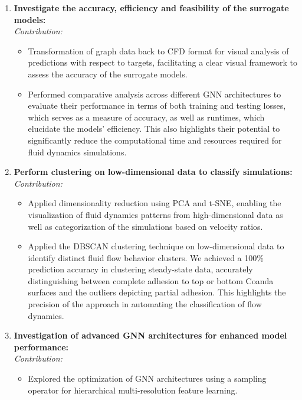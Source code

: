 \begin{enumerate}
    \item \textbf{Investigate the accuracy, efficiency and feasibility of the surrogate models:} \\
    \textit{Contribution:}
    \begin{itemize}
        \item Transformation of graph data back to CFD format for visual analysis of predictions with respect to targets, facilitating a clear visual framework to assess the accuracy of the surrogate models.
        \item Performed comparative analysis across different GNN architectures to evaluate their performance in terms of both training and testing losses, which serves as a measure of accuracy, as well as runtimes, which elucidate the models' efficiency. This also highlights their potential to significantly reduce the computational time and resources required for fluid dynamics simulations. 
    \end{itemize}
    \item \textbf{Perform clustering on low-dimensional data to classify simulations:} \\
    \textit{Contribution:}
    \begin{itemize}
        \item Applied dimensionality reduction using PCA and t-SNE, enabling the visualization of fluid dynamics patterns from high-dimensional data as well as categorization of the simulations based on velocity ratios. 
        \item Applied the DBSCAN clustering technique on low-dimensional data to identify distinct fluid flow behavior clusters. We achieved a 100\% prediction accuracy in clustering steady-state data, accurately distinguishing between complete adhesion to top or bottom Coanda surfaces and the outliers depicting partial adhesion. This highlights the precision of the approach in automating the classification of flow dynamics.
    \end{itemize}
    
    \item \textbf{Investigation of advanced GNN architectures for enhanced model performance:}\\
    \textit{Contribution:}
    \begin{itemize}
        \item Explored the optimization of GNN architectures using a sampling operator for hierarchical multi-resolution feature learning.
    \end{itemize}
\end{enumerate}
